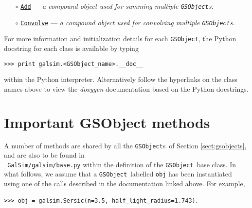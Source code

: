 \documentclass[preprint,11pt]{aastex}
\newcommand{\gsobject}{{\tt GSObject}}
\begin{document}
\begin{itemize}
{  data, including a correction for the original PSF.  Requires the
  download of external data for full functionality.}
\item[$\circ$] \href{http://galsim-developers.github.com/GalSim/classgalsim_1_1base_1_1_add.html}{\texttt{Add}} --- \emph{a \emph{compound} object used for
  summing multiple \gsobject s.}
\item[$\circ$] \href{http://galsim-developers.github.com/GalSim/classgalsim_1_1base_1_1_convolve.html}{\texttt{Convolve}} --- \emph{a \emph{compound} object used for
convolving multiple \gsobject s.}
\end{itemize}

For more information and initialization details for each \gsobject,
the Python docstring for each class is available by typing

{\tt >>> print galsim.<GSObject\_name>.\_\_doc\_\_}

within the Python interpreter. Alternatively follow the hyperlinks on
the class names above to view the \emph{doxygen} documentation based
on the Python docstrings.

\section{Important GSObject methods}\label{sect:gsobjectmethods}
A number of methods are shared by all the \gsobject s~of Section
\ref{sect:gsobjects}, and are also to be found in \\ {\tt
  GalSim/galsim/base.py} within the definition of the \gsobject~base
class.  In what follows, we assume that a \gsobject~labelled
\texttt{obj} has been instantiated using one of the calls described in
the documentation linked above.  For example,

{\tt >>> obj = galsim.Sersic(n=3.5, half\_light\_radius=1.743)}.
\end{document}
